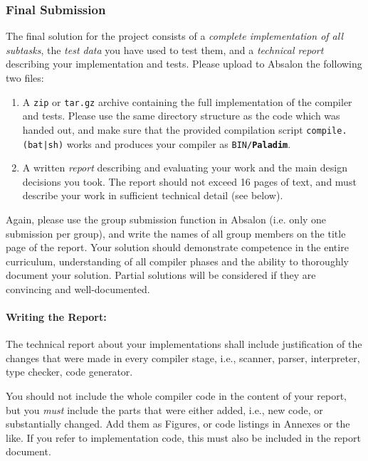 \documentclass[12pt,a4paper]{article}
\newcommand{\paladim}{\textbf{Paladim}\xspace}
\begin{document}
\subsubsection{Final Submission}

The final solution for the project consists of
a \emph{complete implementation of all subtasks},
the \emph{test data} you have used to test them,
and a \emph{technical report} describing your implementation and tests.
%
Please upload to Absalon the following two files:
\begin{enumerate}
\item A \texttt{zip} or \texttt{tar.gz} archive containing the full implementation
	of the compiler and tests. Please use the same directory structure as
    the code which was handed out,
    and make sure that the provided compilation script \texttt{compile.(bat|sh)}
    works and produces your compiler as {\tt BIN/\paladim}.
\item A written \emph{report} describing and evaluating your work and the main design
	decisions you took. %
	The report should not exceed 16 pages of text, and must describe
	your work in sufficient technical detail (see below).

\end{enumerate}
Again,
please use the group submission function in Absalon (i.e. only one submission
per group), and write the names of all group members on the title page of the
report.
%
Your solution should demonstrate competence in the entire curriculum,
understanding of all compiler phases and the ability to thoroughly document your
solution.
%
Partial solutions will be considered if they are convincing and well-documented.

\paragraph{Writing the Report:}
The technical report about your implementations shall include justification of the changes that
were made in every compiler stage, i.e., scanner, parser, interpreter,
type checker, code generator.

You should not include the whole compiler code in the content
of your report, but you {\em must} include the parts that were either
added, i.e., new code, or substantially changed.  Add them as
Figures, or code listings in Annexes or the like.
%
If you refer to implementation code, this must also be included
in the report document.
\end{document}
